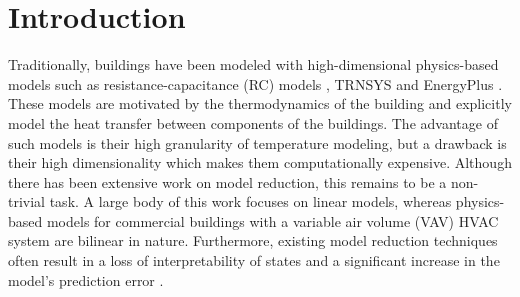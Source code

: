
\section{Introduction}
\label{sec:Introduction}
%
%

Traditionally, buildings have been modeled with high-dimensional physics-based models such as resistance-capacitance (RC) models \cite{Maasoumy:2014ab, Sun, David, Hao_multizone}, TRNSYS \cite{Duffy:2009aa} and EnergyPlus \cite{Zhao2013EP}. These models are motivated by the thermodynamics of the building and explicitly model the heat transfer between components of the buildings. The advantage of such models is their high granularity of temperature modeling, but a drawback is their high dimensionality which makes them computationally expensive. 
Although there has been extensive work on model reduction, this remains to be a non-trivial task. A large body of this work focuses on linear models, whereas physics-based models for commercial buildings with a variable air volume (VAV) HVAC system are bilinear in nature. Furthermore, existing model reduction techniques often result in a loss of interpretability of states \cite{Dobbs:2012aa} and a significant increase in the model's prediction error \cite{Goyal:2012modelreduction}. 

